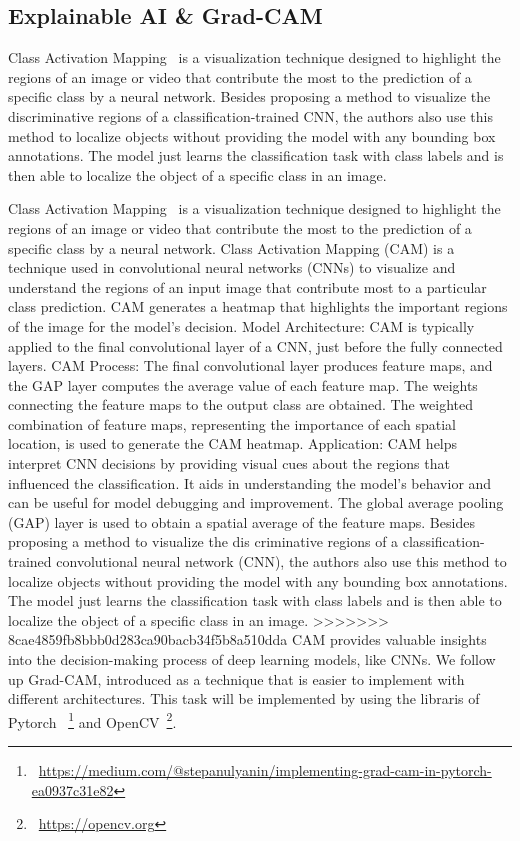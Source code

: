 \subsection{Explainable AI \& Grad-CAM}
\label{sec:optim:cam}

Class Activation Mapping~\cite{ZhouKLOT16} is a visualization technique designed to highlight the regions of an image or video that contribute the most to the prediction of a specific class by a neural network. 
Besides proposing a method to visualize the discriminative regions of a classification-trained CNN, the authors also use this method to localize objects without providing the model with any bounding box annotations. 
The model just learns the classification task with class labels and is then able to localize the object of a specific class in an image. 

Class Activation Mapping~\cite{ZhouKLOT16} is a visualization technique designed to highlight the regions of an image or video that contribute the most to the prediction of a specific class by a neural network. 
Class Activation Mapping (CAM) is a technique used in convolutional neural networks (CNNs) to visualize and understand the regions of an input image that contribute most to a particular class prediction. CAM generates a heatmap that highlights the important regions of the image for the model's decision.
Model Architecture:
CAM is typically applied to the final convolutional layer of a CNN, just before the fully connected layers.
CAM Process:
The final convolutional layer produces feature maps, and the GAP layer computes the average value of each feature map.
The weights connecting the feature maps to the output class are obtained.
The weighted combination of feature maps, representing the importance of each spatial location, is used to generate the CAM heatmap.
Application: 
CAM helps interpret CNN decisions by providing visual cues about the regions that influenced the classification.
It aids in understanding the model's behavior and can be useful for model debugging and improvement.
The global average pooling (GAP) layer is used to obtain a spatial average of the feature maps.
Besides proposing a method to visualize the dis criminative regions of a classification-trained convolutional neural network (CNN), the authors also use this method to localize objects without providing the model with any bounding box annotations. The model just learns the classification task with class labels and is then able to localize the object of a specific class in an image. 
>>>>>>> 8cae4859fb8bbb0d283ca90bacb34f5b8a510dda
CAM provides valuable insights into the decision-making process of deep learning models, like CNNs.
We follow up Grad-CAM\cite{almeida_grad-cam_2023}, introduced as a technique that is easier to implement with different architectures.
This task will be implemented by using the libraris of Pytorch
~\footnote{~\url{https://medium.com/@stepanulyanin/implementing-grad-cam-in-pytorch-ea0937c31e82}}
and OpenCV~\footnote{~\url{https://opencv.org}}.
